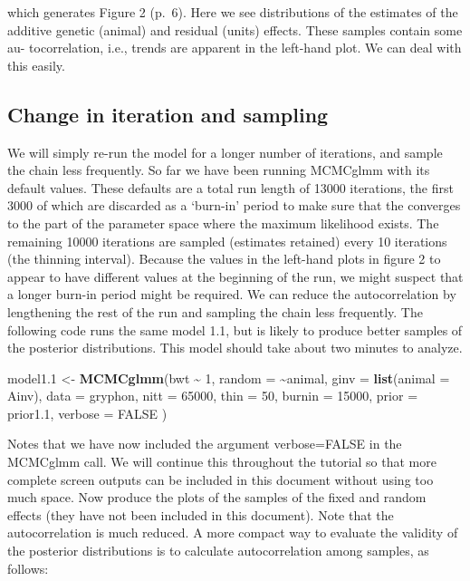 \documentclass[
  12pt,
]{book}
\newenvironment{Shaded}{\begin{snugshade}}{\end{snugshade}}
\newcommand{\DataTypeTok}[1]{\textcolor[rgb]{0.13,0.29,0.53}{#1}}
\newcommand{\DecValTok}[1]{\textcolor[rgb]{0.00,0.00,0.81}{#1}}
\newcommand{\FloatTok}[1]{\textcolor[rgb]{0.00,0.00,0.81}{#1}}
\newcommand{\KeywordTok}[1]{\textcolor[rgb]{0.13,0.29,0.53}{\textbf{#1}}}
\newcommand{\NormalTok}[1]{#1}
\newcommand{\OperatorTok}[1]{\textcolor[rgb]{0.81,0.36,0.00}{\textbf{#1}}}
\newcommand{\OtherTok}[1]{\textcolor[rgb]{0.56,0.35,0.01}{#1}}
\newcommand{\StringTok}[1]{\textcolor[rgb]{0.31,0.60,0.02}{#1}}
\begin{document}
which generates Figure 2 (p.~6). Here we see distributions of the estimates of the additive genetic (animal) and residual (units) effects. These samples contain some au- tocorrelation, i.e., trends are apparent in the left-hand plot. We can deal with this easily.

\hypertarget{change-in-iteration-and-sampling}{%
\subsection{Change in iteration and sampling}\label{change-in-iteration-and-sampling}}

We will simply re-run the model for a longer number of iterations, and sample the chain less frequently. So far we have been running MCMCglmm with its default values. These defaults are a total run length of 13000 iterations, the first 3000 of which are discarded as a `burn-in' period to make sure that the converges to the part of the parameter space where the maximum likelihood exists. The remaining 10000 iterations are sampled (estimates retained) every 10 iterations (the thinning interval). Because the values in the left-hand plots in figure 2 to appear to have different values at the beginning of the run, we might suspect that a longer burn-in period might be required. We can reduce the autocorrelation by lengthening the rest of the run and sampling the chain less frequently. The following code runs the same model 1.1, but is likely to produce better samples of the posterior distributions. This model should take about two minutes to analyze.

\begin{Shaded}
\begin{Highlighting}[]
\NormalTok{model1}\FloatTok{.1}\NormalTok{ \textless{}{-}}\StringTok{ }\KeywordTok{MCMCglmm}\NormalTok{(bwt }\OperatorTok{\textasciitilde{}}\StringTok{ }\DecValTok{1}\NormalTok{,}
  \DataTypeTok{random =} \OperatorTok{\textasciitilde{}}\NormalTok{animal, }\DataTypeTok{ginv =} \KeywordTok{list}\NormalTok{(}\DataTypeTok{animal =}\NormalTok{ Ainv),}
  \DataTypeTok{data =}\NormalTok{ gryphon, }\DataTypeTok{nitt =} \DecValTok{65000}\NormalTok{, }\DataTypeTok{thin =} \DecValTok{50}\NormalTok{, }\DataTypeTok{burnin =} \DecValTok{15000}\NormalTok{,}
  \DataTypeTok{prior =}\NormalTok{ prior1}\FloatTok{.1}\NormalTok{, }\DataTypeTok{verbose =} \OtherTok{FALSE}
\NormalTok{)}
\end{Highlighting}
\end{Shaded}

Notes that we have now included the argument verbose=FALSE in the MCMCglmm call. We will continue this throughout the tutorial so that more complete screen outputs can be included in this document without using too much space. Now produce the plots of the samples of the fixed and random effects (they have not been included in this document). Note that the autocorrelation is much reduced. A more compact way to evaluate the validity of the posterior distributions is to calculate autocorrelation among samples, as follows:
\end{document}
